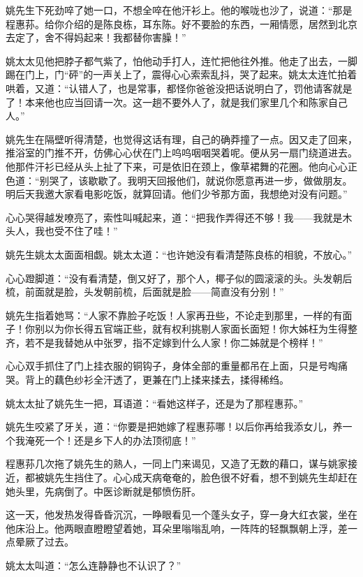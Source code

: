 \par 姚先生下死劲啐了她一口，不想全啐在他汗衫上。他的喉咙也沙了，说道：“那是程惠荪。给你介绍的是陈良栋，耳东陈。好不要脸的东西，一厢情愿，居然到北京去定了，舍不得妈起来！我都替你害臊！”
\par 姚太太见他把脖子都气紫了，怕他动手打人，连忙把他往外推。他走了出去，一脚踢在门上，门“砰”的一声关上了，震得心心索索乱抖，哭了起来。姚太太连忙拍着哄着，又道：“认错人了，也是常事，都怪你爸爸没把话说明白了，罚他请客就是了！本来他也应当回请一次。这一趟不要外人了，就是我们家里几个和陈家自己人。”
\par 姚先生在隔壁听得清楚，也觉得这话有理，自己的确莽撞了一点。因又走了回来，推浴室的门推不开，仿佛心心伏在门上呜呜咽咽哭着呢。便从另一扇门绕道进去。他那件汗衫已经从头上扯了下来，可是依旧在颈上，像草裙舞的花圈。他向心心正色道：“别哭了，该歇歇了。我明天回报他们，就说你愿意再进一步，做做朋友。明后天我邀大家看电影吃饭，就算回请。他们少爷那方面，我想绝对没有问题。”
\par 心心哭得越发嘹亮了，索性叫喊起来，道：“把我作弄得还不够！我——我就是木头人，我也受不住了哇！”
\par 姚先生姚太太面面相觑。姚太太道：“也许她没有看清楚陈良栋的相貌，不放心。”
\par 心心蹬脚道：“没有看清楚，倒又好了，那个人，椰子似的圆滚滚的头。头发朝后梳，前面就是脸，头发朝前梳，后面就是脸——简直没有分别！”
\par 姚先生指着她骂：“人家不靠脸子吃饭！人家再丑些，不论走到那里，一样的有面子！你别以为你长得五官端正些，就有权利挑剔人家面长面短！你大姊枉为生得整齐，若不是我替她从中张罗，指不定嫁到什么人家！你二姊就是个榜样！”
\par 心心双手抓住了门上挂衣服的铜钩子，身体全部的重量都吊在上面，只是号啕痛哭。背上的藕色纱衫全汗透了，更兼在门上揉来揉去，揉得稀绉。
\par 姚太太扯了姚先生一把，耳语道：“看她这样子，还是为了那程惠荪。”
\par 姚先生咬紧了牙关，道：“你要是把她嫁了程惠荪哪！以后你再给我添女儿，养一个我淹死一个！还是乡下人的办法顶彻底！”
\par 程惠荪几次拖了姚先生的熟人，一同上门来谒见，又造了无数的藉口，谋与姚家接近，都被姚先生挡住了。心心成天病奄奄的，脸色很不好看，想不到姚先生却赶在她头里，先病倒了。中医诊断就是郁愤伤肝。
\par 这一天，他发热发得昏昏沉沉，一睁眼看见一个蓬头女子，穿一身大红衣裳，坐在他床沿上。他两眼直瞪瞪望着她，耳朵里嗡嗡乱响，一阵阵的轻飘飘朝上浮，差一点晕厥了过去。
\par 姚太太叫道：“怎么连静静也不认识了？”

